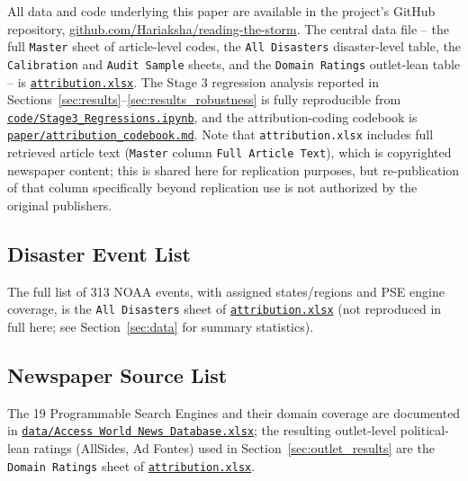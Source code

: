 \documentclass[12pt]{article}
\begin{document}
\begin{sloppypar}
All data and code underlying this paper are available in the project's
GitHub repository,
\href{https://github.com/Hariaksha/reading-the-storm}{github.com/Hariaksha/reading-the-storm}.
The central data file -- the full \texttt{Master} sheet of article-level
codes, the \texttt{All Disasters} disaster-level table, the
\texttt{Calibration} and \texttt{Audit Sample} sheets, and the
\texttt{Domain Ratings} outlet-lean table -- is
\href{https://github.com/Hariaksha/reading-the-storm/blob/main/attribution.xlsx}{\texttt{attribution.xlsx}}.
The Stage 3 regression analysis reported in
Sections~\ref{sec:results}--\ref{sec:results_robustness} is fully
reproducible from
\href{https://github.com/Hariaksha/reading-the-storm/blob/main/code/Stage3_Regressions.ipynb}{\texttt{code/Stage3\_Regressions.ipynb}},
and the attribution-coding codebook is
\href{https://github.com/Hariaksha/reading-the-storm/blob/main/paper/attribution_codebook.md}{\texttt{paper/attribution\_codebook.md}}.
Note that \texttt{attribution.xlsx} includes full retrieved article text
(\texttt{Master} column \texttt{Full Article Text}), which is copyrighted
newspaper content; this is shared here for replication purposes, but
re-publication of that column specifically beyond replication use is not
authorized by the original publishers.
\end{sloppypar}

\subsection{Disaster Event List}

The full list of 313 NOAA events, with assigned states/regions and PSE
engine coverage, is the \texttt{All Disasters} sheet of
\href{https://github.com/Hariaksha/reading-the-storm/blob/main/attribution.xlsx}{\texttt{attribution.xlsx}}
(not reproduced in full here; see Section~\ref{sec:data} for summary
statistics).

\subsection{Newspaper Source List}

\begin{sloppypar}
The 19 Programmable Search Engines and their domain coverage are
documented in
\href{https://github.com/Hariaksha/reading-the-storm/blob/main/data/Access\%20World\%20News\%20Database.xlsx}{\texttt{data/Access World News Database.xlsx}};
the resulting outlet-level political-lean ratings (AllSides, Ad Fontes)
used in Section~\ref{sec:outlet_results} are the \texttt{Domain Ratings}
sheet of
\href{https://github.com/Hariaksha/reading-the-storm/blob/main/attribution.xlsx}{\texttt{attribution.xlsx}}.
\end{sloppypar}
\end{document}
